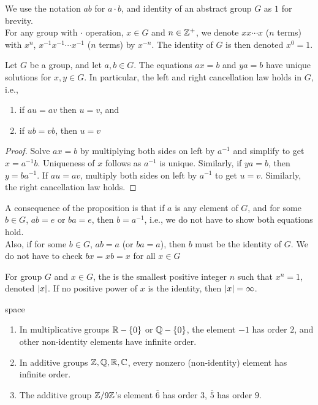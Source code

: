 We use the notation $ab$ for $a \cdot b$, and identity of an abstract group $G$ as $1$ for brevity.\\
For any group with $\cdot$ operation, $x \in G$ and $n \in \mathbb{Z}^+$, we denote $xx\cdots x$ ($n$ terms) with $x^n$, $x^{-1} x^{-1} \cdots x^{-1}$ ($n$ terms) by $x^{-n}$. The identity of $G$ is then denoted $x^0 = 1$.

\begin{proposition}
Let $G$ be a group, and let $a,b \in G$. The equations $ax=b$ and $ya=b$ have unique solutions for $x,y \in G$. In particular, the left and right cancellation law holds in $G$, i.e.,
\begin{enumerate}[label=(\roman*)]
\setlength{\itemsep}{0pt}
\item if $au=av$ then $u=v$, and
\item if $ub=vb$, then $u=v$
\end{enumerate}
\end{proposition}
\begin{proof}
Solve $ax=b$ by multiplying both sides on left by $a^{-1}$ and simplify to get $x=a^{-1}b$. Uniqueness of $x$ follows as $a^{-1}$ is unique. Similarly, if $ya=b$, then $y=ba^{-1}$. If $au=av$, multiply both sides on left by $a^{-1}$ to get $u=v$. Similarly, the right cancellation law holds.
\end{proof}

A consequence of the proposition is that if $a$ is any element of $G$, and for some $b\in G$, $ab=e$ or $ba=e$, then $b=a^{-1}$, i.e., we do not have to show both equations hold.\\
Also, if for some $b\in G$, $ab=a$ (or $ba=a$), then $b$ must be the identity of $G$. We do not have to check $bx=xb=x$ for all $x\in G$

\begin{definition}
For group $G$ and $x\in G$, the  is the smallest positive integer $n$ such that $x^n = 1$, denoted $\left\lvert x\right\rvert$. If no positive power of $x$ is the identity, then $\left\lvert x\right\rvert = \infty$.
\end{definition}

\begin{example}{\color{white}space}
\begin{enumerate}[label=(\roman*)]
\setlength{\itemsep}{0pt}
\item In multiplicative groups $\mathbb{R} - \{0\}$ or $\mathbb{Q} - \{0\}$, the element $-1$ has order $2$, and other non-identity elements have infinite order.
\item In additive groups $\mathbb{Z}, \mathbb{Q}, \mathbb{R}, \mathbb{C}$, every nonzero (non-identity) element has infinite order.
\item The additive group $\mathbb{Z} / 9\mathbb{Z}$'s element $\overline{6}$ has order $3$, $\overline{5}$ has order $9$.
\end{enumerate}
\end{example}

